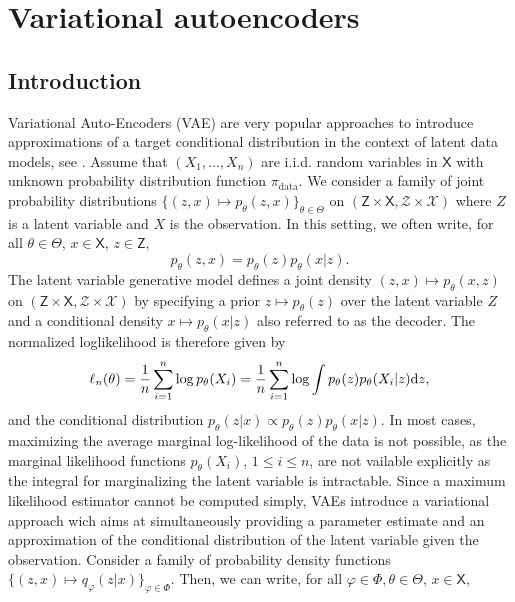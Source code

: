 \documentclass[english,graybox,envcountchap,envcountsame,sectrefs,shortlabels]{svmono}
\theoremstyle{style}
\renewenvironment{keywords}{\textit{\bf Keywords: } \sffamily }{}
\newcommand{\eqsp}{}
\begin{document}
\chapter{Variational autoencoders}
\minitoc
\section{Introduction}
Variational Auto-Encoders (VAE) are very popular approaches to introduce approximations of a target conditional distribution in the context of latent data models, see \cite{rezende2014stochastic,kingma2019introduction}. Assume that $(X_1,\ldots,X_n)$ are i.i.d. random variables in $\mathsf{X}$ with unknown probability distribution function $\pi_{\mathrm{data}}$. We consider a family of joint probability distributions $\{(z,x) \mapsto  p_{\theta}(z,x)\}_{\theta\in\Theta}$ on $(\mathsf{Z}\times \mathsf{X}, \mathcal{Z}\times \mathcal{X})$ where $Z$ is a latent variable and $X$ is the observation. In this setting, we often write, for all $\theta\in\Theta$, $x\in\mathsf{X}$, $z\in\mathsf{Z}$,
$$
p_{\theta}(z,x) = p_{\theta}(z)p_{\theta}(x|z)\eqsp.
$$
The latent variable generative model defines a joint density $(z,x)\mapsto p_\theta(x, z)$  on $(\mathsf{Z}\times \mathsf{X}, \mathcal{Z}\times \mathcal{X})$  by specifying a prior $z\mapsto p_{\theta}(z)$ over the latent variable $Z$ and a conditional density $x\mapsto p_\theta(x|z)$ also referred to as the decoder.  The normalized loglikelihood is therefore given by
$$
\ell_n(\theta) = \frac{1}{n}\sum_{i=1}^n \log p_{\theta}(X_i) = \frac{1}{n}\sum_{i=1}^n \log \int p_{\theta}(z)p_{\theta}(X_i|z)\rmd z\eqsp,
$$
and the conditional distribution $p_{\theta}(z|x)\propto p_{\theta}(z)p_{\theta}(x|z)$. In most cases, maximizing the average
marginal log-likelihood of the data is not possible, as the marginal likelihood functions $p_{\theta}(X_i)$, $1\leqslant i \leqslant n$, are not vailable explicitly as the integral for marginalizing the latent variable is intractable.  Since a maximum likelihood estimator cannot be computed simply, VAEs introduce a variational approach wich aims at simultaneously providing a parameter estimate  and an approximation of the conditional distribution of the latent variable given the observation.  Consider a family of probability density functions $\{(z,x) \mapsto q_{\varphi}(z|x)\}_{\varphi\in\Phi}$. Then, we can write, for all $\varphi\in\Phi,\theta\in\Theta$, $x\in\mathsf{X}$,
\end{document}
